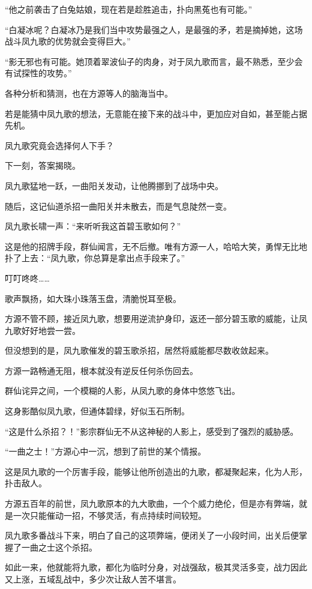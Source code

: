 \begin{this_body}
“他之前袭击了白兔姑娘，现在若是趁胜追击，扑向黑菟也有可能。”

“白凝冰呢？白凝冰乃是我们当中攻势最强之人，是最强的矛，若是摘掉她，这场战斗凤九歌的优势就会变得巨大。”

“影无邪也有可能。她顶着翠波仙子的肉身，对于凤九歌而言，最不熟悉，至少会有试探性的攻势。”

各种分析和猜测，也在方源等人的脑海当中。

若是能猜中凤九歌的想法，无意能在接下来的战斗中，更加应对自如，甚至能占据先机。

凤九歌究竟会选择何人下手？

下一刻，答案揭晓。

凤九歌猛地一跃，一曲阳关发动，让他腾挪到了战场中央。

随后，这记仙道杀招一曲阳关并未散去，而是气息陡然一变。

凤九歌长啸一声：“来听听我这首碧玉歌如何？”

这是他的招牌手段，群仙闻言，无不后撤。唯有方源一人，哈哈大笑，勇悍无比地扑了上去：“凤九歌，你总算是拿出点手段来了。”

叮叮咚咚……

歌声飘扬，如大珠小珠落玉盘，清脆悦耳至极。

方源不管不顾，接近凤九歌，想要用逆流护身印，返还一部分碧玉歌的威能，让凤九歌好好地尝一尝。

但没想到的是，凤九歌催发的碧玉歌杀招，居然将威能都尽数收敛起来。

方源一路畅通无阻，根本就没有逆反任何杀伤回去。

群仙诧异之间，一个模糊的人影，从凤九歌的身体中悠悠飞出。

这身影酷似凤九歌，但通体碧绿，好似玉石所制。

“这是什么杀招？！”影宗群仙无不从这神秘的人影上，感受到了强烈的威胁感。

“一曲之士！”方源心中一沉，想到了前世的某个情报。

这是凤九歌的一个厉害手段，能够让他所创造出的九歌，都凝聚起来，化为人形，扑击敌人。

方源五百年的前世，凤九歌原本的九大歌曲，一个个威力绝伦，但是亦有弊端，就是一次只能催动一招，不够灵活，有点持续时间较短。

凤九歌多番战斗下来，明白了自己的这项弊端，便闭关了一小段时间，出关后便掌握了一曲之士这个杀招。

如此一来，他就能将九歌，都化为临时分身，对战强敌，极其灵活多变，战力因此又上涨，五域乱战中，多少次让敌人苦不堪言。


\end{this_body}
